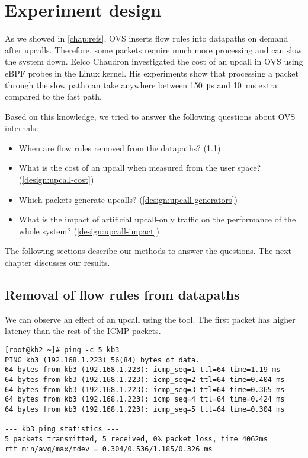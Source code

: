 \chapter{Experiment design}
\label{chap:design}

As we showed in \cref{chap:refs}, OVS inserts flow rules into datapaths on demand after upcalls. Therefore, some packets require much more processing and can slow the system down. Eelco Chaudron investigated the cost of an upcall in OVS \cite{UpcallCost} using eBPF probes in the Linux kernel. His experiments show that processing a packet through the slow path can take anywhere between \qty{150}{\us} and \qty{10}{\ms} extra compared to the fast path.

Based on this knowledge, we tried to answer the following questions about OVS internals:

\begin{itemize}
    \item When are flow rules removed from the datapaths? (\cref{design:flow-eviction})
    \item What is the cost of an upcall when measured from the user space? (\cref{design:upcall-cost})
    \item Which packets generate upcalls? (\cref{design:upcall-generators})
    \item What is the impact of artificial upcall-only traffic on the performance of the whole system? (\cref{design:upcall-impact})
\end{itemize}

The following sections describe our methods to answer the questions. The next chapter discusses our results.




\section{Removal of flow rules from datapaths}
\label{design:flow-eviction}

We can observe an effect of an upcall using the  tool. The first packet has higher latency than the rest of the ICMP packets.

\vspace{0.5cm}

\begin{lstlisting}[caption=Output of the \ident{ping} command in the virtualized environment, captionpos=b, basicstyle=\ttfamily\scriptsize]
[root@kb2 ~]# ping -c 5 kb3
PING kb3 (192.168.1.223) 56(84) bytes of data.
64 bytes from kb3 (192.168.1.223): icmp_seq=1 ttl=64 time=1.19 ms
64 bytes from kb3 (192.168.1.223): icmp_seq=2 ttl=64 time=0.404 ms
64 bytes from kb3 (192.168.1.223): icmp_seq=3 ttl=64 time=0.365 ms
64 bytes from kb3 (192.168.1.223): icmp_seq=4 ttl=64 time=0.424 ms
64 bytes from kb3 (192.168.1.223): icmp_seq=5 ttl=64 time=0.304 ms

--- kb3 ping statistics ---
5 packets transmitted, 5 received, 0% packet loss, time 4062ms
rtt min/avg/max/mdev = 0.304/0.536/1.185/0.326 ms
\end{lstlisting}

